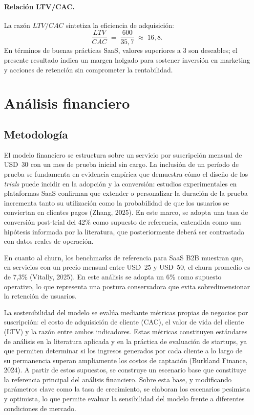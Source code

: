 \paragraph{Relación LTV/CAC.}
La razón $LTV/CAC$ sintetiza la eficiencia de adquisición:
\[
\frac{LTV}{CAC} \;=\; \frac{600}{35{,}7} \;\approx\; 16{,}8.
\]
En términos de buenas prácticas SaaS, valores superiores a 3 son deseables; el presente resultado indica un margen holgado para sostener inversión en marketing y acciones de retención sin comprometer la rentabilidad.



\section{Análisis financiero}

\subsection{Metodología}

El modelo financiero se estructura sobre un servicio por suscripción mensual de USD~30 con un mes de prueba inicial sin cargo. La inclusión de un período de prueba se fundamenta en evidencia empírica que demuestra cómo el diseño de los \textit{trials} puede incidir en la adopción y la conversión: estudios experimentales en plataformas SaaS confirman que extender o personalizar la duración de la prueba incrementa tanto su utilización como la probabilidad de que los usuarios se conviertan en clientes pagos (Zhang, 2025). En este marco, se adopta una tasa de conversión post‐trial del 42\% como supuesto de referencia, entendida como una hipótesis informada por la literatura, que posteriormente deberá ser contrastada con datos reales de operación.

En cuanto al churn, los benchmarks de referencia para SaaS B2B muestran que, en servicios con un precio mensual entre USD~25 y USD~50, el churn promedio es de 7,3\% (Vitally, 2025). En este análisis se adopta un 6\% como supuesto operativo, lo que representa una postura conservadora que evita sobredimensionar la retención de usuarios.



La sostenibilidad del modelo se evalúa mediante métricas propias de negocios por suscripción: el costo de adquisición de cliente (CAC), el valor de vida del cliente (LTV) y la razón entre ambos indicadores. Estas métricas constituyen estándares de análisis en la literatura aplicada y en la práctica de evaluación de startups, ya que permiten determinar si los ingresos generados por cada cliente a lo largo de su permanencia superan ampliamente los costos de captación (Burkland Finance, 2024). A partir de estos supuestos, se construye un escenario base que constituye la referencia principal del análisis financiero. Sobre esta base, y modificando parámetros clave como la tasa de crecimiento, se elaboran los escenarios pesimista y optimista, lo que permite evaluar la sensibilidad del modelo frente a diferentes condiciones de mercado.



